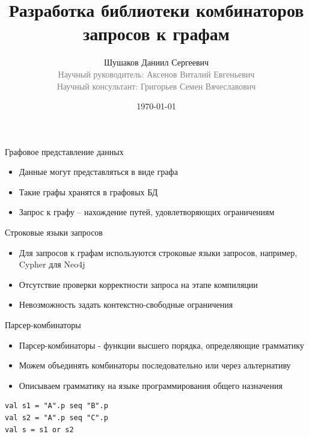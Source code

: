 \documentclass[aspectratio=169]{beamer}
\begin{document}
\title[Комбинаторы запросов к графам]
{
  Разработка библиотеки комбинаторов запросов к графам
}
\author[Шушаков Д.С.]
{
Шушаков Даниил Сергеевич\\
{\footnotesize\textcolor{gray}{Научный руководитель: Аксенов Виталий Евгеньевич}}\\
{\footnotesize\textcolor{gray}{Научный консультант: Григорьев Семен Вячеславович}}
}
\date{\today}

\frame{\titlepage}

\setlength{\parskip}{0.25cm}

\begin{frame}{Графовое представление данных}
  \begin{itemize}
    \item Данные могут представляться в виде графа
    \item Такие графы хранятся в графовых БД
    \item Запрос к графу -- нахождение путей, удовлетворяющих ограничениям
  \end{itemize}
\end{frame}


\begin{frame}{Строковые языки запросов}
  \begin{itemize}
    \item Для запросов к графам используются строковые языки запросов, например, Cypher для Neo4j
    \item Отсутствие проверки корректности запроса на этапе компиляции
    \item Невозможность задать контекстно-свободные ограничения
  \end{itemize}
\end{frame}


\begin{frame}[fragile]{Парсер-комбинаторы}
  \begin{itemize}
    \item Парсер-комбинаторы - функции высшего порядка, определяющие грамматику
    \item Можем объединять комбинаторы последовательно или через альтернативу
    \item Описываем грамматику на языке программирования общего назначения
  \end{itemize}


  \begin{verbatim}
val s1 = "A".p seq "B".p
val s2 = "A".p seq "C".p
val s = s1 or s2
  \end{verbatim}
\end{frame}
\end{document}
